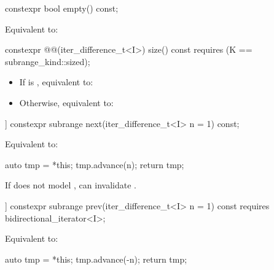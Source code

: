 %
\begin{itemdecl}
constexpr bool empty() const;
\end{itemdecl}

\begin{itemdescr}
\pnum
\effects Equivalent to: 
\end{itemdescr}

%
\begin{itemdecl}
constexpr @@(iter_difference_t<I>) size() const
  requires (K == subrange_kind::sized);
\end{itemdecl}

\begin{itemdescr}
\pnum
\effects
\begin{itemize}
\item If  is , equivalent to: 
\item Otherwise, equivalent to: 
\end{itemize}
\end{itemdescr}

%
\begin{itemdecl}
[[nodiscard]] constexpr subrange next(iter_difference_t<I> n = 1) const;
\end{itemdecl}

\begin{itemdescr}
\pnum
\effects Equivalent to:
\begin{codeblock}
auto tmp = *this;
tmp.advance(n);
return tmp;
\end{codeblock}

\pnum
\begin{note}
If  does not model , 
can invalidate .
\end{note}
\end{itemdescr}

%
\begin{itemdecl}
[[nodiscard]] constexpr subrange prev(iter_difference_t<I> n = 1) const
  requires bidirectional_iterator<I>;
\end{itemdecl}

\begin{itemdescr}
\pnum
\effects Equivalent to:
\begin{codeblock}
auto tmp = *this;
tmp.advance(-n);
return tmp;
\end{codeblock}
\end{itemdescr}


